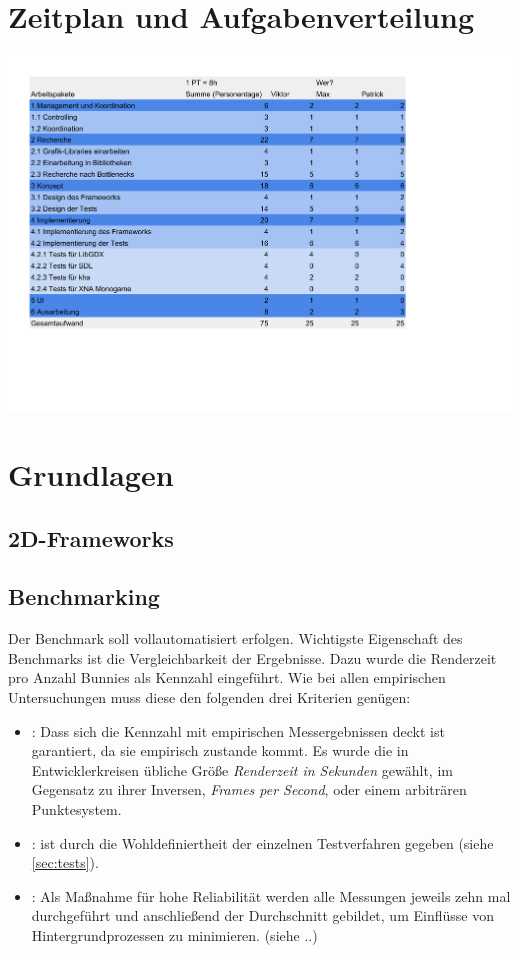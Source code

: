 \chapter{Zeitplan und Aufgabenverteilung}
\includegraphics[width=1.2\textwidth]{projektplan.pdf}


\chapter{Grundlagen}
\section{2D-Frameworks}
\section{Benchmarking}
Der Benchmark soll vollautomatisiert erfolgen. Wichtigste Eigenschaft des Benchmarks ist die Vergleichbarkeit der Ergebnisse. Dazu wurde die Renderzeit pro Anzahl Bunnies als Kennzahl eingeführt. Wie bei allen empirischen Untersuchungen muss diese den folgenden drei Kriterien gen\"ugen:\\
\begin{itemize} 
\item {}: Dass sich die Kennzahl mit empirischen Messergebnissen deckt ist garantiert, da sie empirisch zustande kommt. Es wurde die in Entwicklerkreisen \"ubliche Gr\"o\ss{}e {\em Renderzeit in Sekunden} gew\"ahlt, im Gegensatz zu ihrer Inversen, {\em Frames per Second}, oder einem arbitr\"aren Punktesystem. 
\item {}: ist durch die Wohldefiniertheit der einzelnen Testverfahren gegeben (siehe \ref{sec:tests}).
\item {}: Als Ma\ss{}nahme f\"ur hohe Reliabilit\"at werden alle Messungen jeweils zehn mal durchgef\"uhrt und anschlie\ss{}end der Durchschnitt gebildet, um Einfl\"usse von Hintergrundprozessen zu minimieren. (siehe ..) 
\end{itemize}


